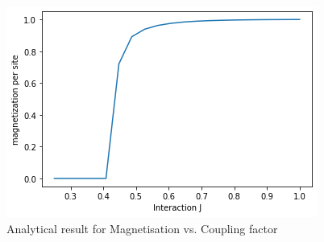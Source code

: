 \documentclass{article}
\begin{document}
\begin{figure}[h!]
    \centering
    \includegraphics[width=.9\textwidth]{mag-int-analy.png}
    \caption{Analytical result for Magnetisation vs. Coupling factor}
    \label{fig:mag-int-analy}
\end{figure}
\end{document}

